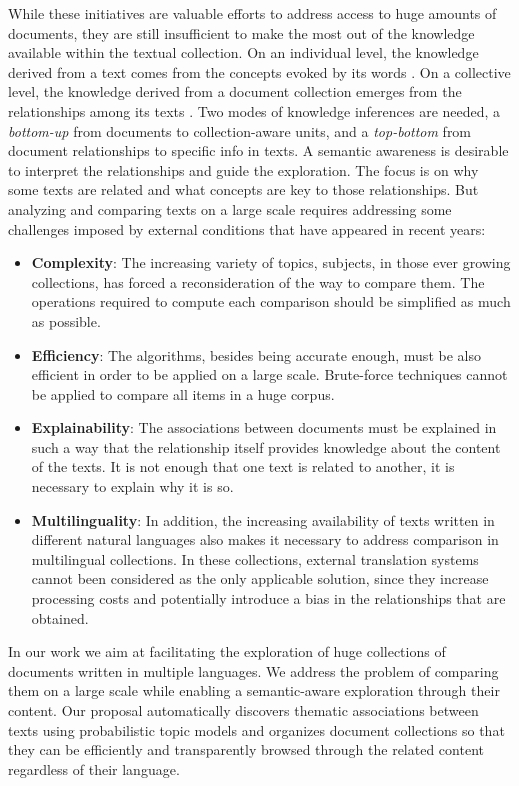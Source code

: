 While these initiatives are valuable efforts to address access to huge amounts of documents, they are still insufficient to make the most out of the knowledge available within the textual collection. On an individual level, the knowledge derived from a text comes from the concepts evoked by its words \citep{Griffiths2007}. On a collective level, the knowledge derived from a document collection emerges from the relationships among its texts \citep{Kenter2015}. Two modes of knowledge inferences are needed, a \textit{bottom-up} from documents to collection-aware units, and a \textit{top-bottom} from document relationships to specific info in texts. A semantic awareness is desirable to interpret the relationships and guide the exploration. The focus is on why some texts are related and what concepts are key to those relationships. But analyzing and comparing texts on a large scale requires addressing some challenges imposed by external conditions that have appeared in recent years:
\begin{itemize}
\item \textbf{Complexity}: The increasing variety of topics, subjects, in those ever growing collections, has forced a reconsideration of the way to compare them. The operations required to compute each comparison should be simplified as much as possible.
\item \textbf{Efficiency}: The algorithms, besides being accurate enough, must be also efficient in order to be applied on a large scale. Brute-force techniques cannot be applied to compare all items in a huge corpus.
\item \textbf{Explainability}: The associations between documents must be explained in such a way that the relationship itself provides knowledge about the content of the texts. It is not enough that one text is related to another, it is necessary to explain why it is so. 
\item \textbf{Multilinguality}: In addition, the increasing availability of texts written in different natural languages also makes it necessary to address comparison in multilingual collections. In these collections, external translation systems cannot been considered as the only applicable solution, since they increase processing costs and potentially introduce a bias in the relationships that are obtained. 
\end{itemize}

In our work we aim at facilitating the exploration of huge collections of documents written in multiple languages. We address the problem of comparing them on a large scale while enabling a semantic-aware exploration through their content. Our proposal automatically discovers thematic associations between texts using probabilistic topic models and organizes document collections so that they can be efficiently and transparently browsed through the related content regardless of their language.

